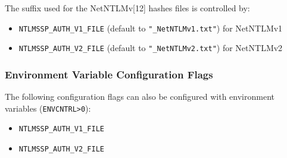 \documentclass[documentation]{subfiles}
\begin{document}
The suffix used for the NetNTLMv[12] hashes files is controlled by:
\begin{itemize}
    \item {\tt NTLMSSP\_AUTH\_V1\_FILE} (default to {\tt "\_NetNTLMv1.txt"}) for NetNTLMv1
    \item {\tt NTLMSSP\_AUTH\_V2\_FILE} (default to {\tt "\_NetNTLMv2.txt"}) for NetNTLMv2
\end{itemize}

\subsubsection{Environment Variable Configuration Flags}
The following configuration flags can also be configured with environment variables ({\tt ENVCNTRL>0}):
\begin{itemize}
    \item {\tt NTLMSSP\_AUTH\_V1\_FILE}
    \item {\tt NTLMSSP\_AUTH\_V2\_FILE}
\end{itemize}
\end{document}
